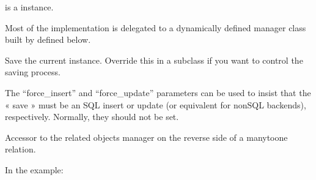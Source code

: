 \documentclass[letterpaper,10pt,french]{sphinxmanual}
\begin{document}
\begin{fulllineitems}
\begin{fulllineitems}
\sphinxAtStartPar
{} is a  instance.

\sphinxAtStartPar
Most of the implementation is delegated to a dynamically defined manager
class built by  defined below.

\end{fulllineitems}


\begin{fulllineitems}
\label{\detokenize{main/model:main.models.AnneeUniversitaire.save}}
\pysigstartsignatures
{}
\pysigstopsignatures
\sphinxAtStartPar
Save the current instance. Override this in a subclass if you want to
control the saving process.

\sphinxAtStartPar
The “force\_insert” and “force\_update” parameters can be used to insist
that the « save » must be an SQL insert or update (or equivalent for
non\sphinxhyphen{}SQL backends), respectively. Normally, they should not be set.

\end{fulllineitems}


\begin{fulllineitems}
\label{\detokenize{main/model:main.models.AnneeUniversitaire.semestre_set}}
\pysigstartsignatures
{}
\pysigstopsignatures
\sphinxAtStartPar
Accessor to the related objects manager on the reverse side of a
many\sphinxhyphen{}to\sphinxhyphen{}one relation.

\sphinxAtStartPar
In the example:

\begin{sphinxVerbatim}[commandchars=\\\{\}]
 
       
\end{sphinxVerbatim}


\end{fulllineitems}
\end{fulllineitems}
\end{document}
